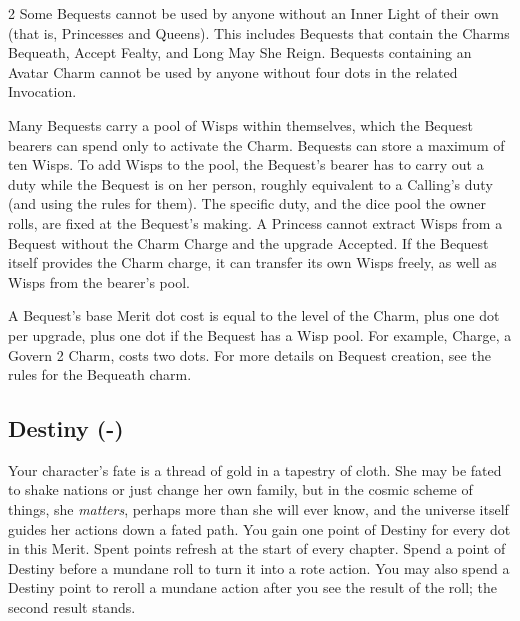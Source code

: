 \begin{multicols}{2}
Some Bequests cannot be used by anyone without an Inner Light of their own (that is, Princesses and Queens). This includes Bequests that contain the Charms Bequeath, Accept Fealty, and Long May She Reign. Bequests containing an Avatar Charm cannot be used by anyone without four dots in the related Invocation.

Many Bequests carry a pool of Wisps within themselves, which the Bequest bearers can spend only to activate the Charm. Bequests can store a maximum of ten Wisps. To add Wisps to the pool, the Bequest’s bearer has to carry out a duty while the Bequest is on her person, roughly equivalent to a Calling's duty (and using the rules for them). The specific duty, and the dice pool the owner rolls, are fixed at the Bequest’s making. A Princess cannot extract Wisps from a Bequest without the Charm Charge and the upgrade Accepted. If the Bequest itself provides the Charm charge, it can transfer its own Wisps freely, as well as Wisps from the bearer's pool.

A Bequest's base Merit dot cost is equal to the level of the Charm, plus one dot per upgrade, plus one dot if the Bequest has a Wisp pool. For example, Charge, a Govern 2 Charm, costs two dots. For more details on Bequest creation, see the rules for the Bequeath charm.

\subsection*{Destiny (\textbullet\nobreak\hspace{.16667em}-\nobreak\hspace{.16667em}\textbullet\textbullet\textbullet\textbullet\textbullet)}

Your character’s fate is a thread of gold in a tapestry of cloth. She may be fated to shake nations or just change her own family, but in the cosmic scheme of things, she \textit{matters}, perhaps more than she will ever know, and the universe itself guides her actions down a fated path. You gain one point of Destiny for every dot in this Merit. Spent points refresh at the start of every chapter. Spend a point of Destiny before a mundane roll to turn it into a rote action. You may also spend a Destiny point to reroll a mundane action after you see the result of the roll; the second result stands. 


\end{multicols}

